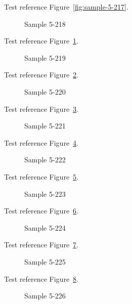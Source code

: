 Test reference Figure~\ref{fig:sample-5-217}.

\begin{figure}[tbhp]
\caption{Sample 5-218}
\label{fig:sample-5-218}
\end{figure}

Test reference Figure~\ref{fig:sample-5-218}.

\begin{figure}[tbhp]
\caption{Sample 5-219}
\label{fig:sample-5-219}
\end{figure}

Test reference Figure~\ref{fig:sample-5-219}.

\begin{figure}[tbhp]
\caption{Sample 5-220}
\label{fig:sample-5-220}
\end{figure}

Test reference Figure~\ref{fig:sample-5-220}.

\begin{figure}[tbhp]
\caption{Sample 5-221}
\label{fig:sample-5-221}
\end{figure}

Test reference Figure~\ref{fig:sample-5-221}.

\begin{figure}[tbhp]
\caption{Sample 5-222}
\label{fig:sample-5-222}
\end{figure}

Test reference Figure~\ref{fig:sample-5-222}.

\begin{figure}[tbhp]
\caption{Sample 5-223}
\label{fig:sample-5-223}
\end{figure}

Test reference Figure~\ref{fig:sample-5-223}.

\begin{figure}[tbhp]
\caption{Sample 5-224}
\label{fig:sample-5-224}
\end{figure}

Test reference Figure~\ref{fig:sample-5-224}.

\begin{figure}[tbhp]
\caption{Sample 5-225}
\label{fig:sample-5-225}
\end{figure}

Test reference Figure~\ref{fig:sample-5-225}.

\begin{figure}[tbhp]
\caption{Sample 5-226}
\label{fig:sample-5-226}
\end{figure}

